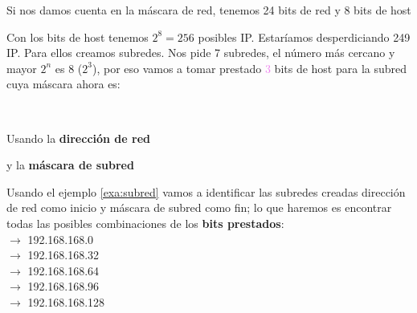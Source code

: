 \documentclass[
	12pt, %
	fleqn, %
	a4paper, %
	oneside, %
]{LegrandOrangeBook}
\begin{document}
\begin{example}\label{exa:subred}
Si nos damos cuenta en la máscara de red, tenemos 24 bits de red y 8 bits de host\\
\begin{center}
\end{center}
Con los bits de host tenemos $2^8=256$ posibles IP. Estaríamos desperdiciando 249 IP. Para ellos creamos subredes. Nos pide 7 subredes, el número más cercano y mayor $2^n$ es 8 ($2^3$), por eso vamos a tomar prestado \textcolor{violet}{3} bits de host para la subred cuya máscara ahora es:\\
\begin{center}
\\
\end{center}
Usando la \textbf{dirección de red}\\
\begin{center}
\end{center}
y la \textbf{máscara de subred}\\
\begin{center}
\end{center}
\end{example}
Usando el ejemplo \ref{exa:subred} vamos a identificar las subredes creadas dirección de red como inicio y máscara de subred como fin; lo que haremos es encontrar todas las posibles combinaciones de los \textbf{bits prestados}:\\
$\rightarrow$ 192.168.168.0\\
$\rightarrow$ 192.168.168.32\\
$\rightarrow$ 192.168.168.64\\
$\rightarrow$ 192.168.168.96\\
$\rightarrow$ 192.168.168.128\\
\end{document}
